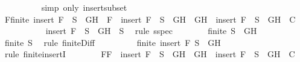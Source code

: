 \begin{isabellebody}
\ \ \ \ \ \ \ \ \isamarkupfalse%
\ {\isacharparenleft}simp\ only{\isacharcolon}\ insert{\isacharunderscore}subset{\isacharparenright}\isanewline
\ \ \ \ \ \ \isamarkupfalse%
\ F{}{\isacharcolon}{\isachardoublequoteopen}finite\ {\isacharparenleft}insert\ F\ \ {\isacharparenleft}S{\isacharprime}\ {\isacharminus}\ {\isacharbraceleft}G{\isacharcomma}H{\isacharbraceright}{\isacharparenright}{\isacharparenright}\ {\isasymlongrightarrow}\ F\ {\isasymin}\ {\isacharparenleft}insert\ F\ \ {\isacharparenleft}S{\isacharprime}\ {\isacharminus}\ {\isacharbraceleft}G{\isacharcomma}H{\isacharbraceright}{\isacharparenright}{\isacharparenright}\ {\isasymlongrightarrow}\ {\isacharbraceleft}G{\isacharcomma}H{\isacharbraceright}\ {\isasymunion}\ {\isacharparenleft}insert\ F\ \ {\isacharparenleft}S{\isacharprime}\ {\isacharminus}\ {\isacharbraceleft}G{\isacharcomma}H{\isacharbraceright}{\isacharparenright}{\isacharparenright}\ {\isasymin}\ C{\isachardoublequoteclose}\isanewline
\ \ \ \ \ \ \ \ \isamarkupfalse%
\ {}\ {\isacartoucheopen}insert\ F\ \ {\isacharparenleft}S{\isacharprime}\ {\isacharminus}\ {\isacharbraceleft}G{\isacharcomma}H{\isacharbraceright}{\isacharparenright}\ {\isasymsubseteq}\ S{\isacartoucheclose}\ \isamarkupfalse%
\ {\isacharparenleft}rule\ sspec{\isacharparenright}\isanewline
\ \ \ \ \ \ \isamarkupfalse%
\ {\isachardoublequoteopen}finite\ {\isacharparenleft}S{\isacharprime}\ {\isacharminus}\ {\isacharbraceleft}G{\isacharcomma}H{\isacharbraceright}{\isacharparenright}{\isachardoublequoteclose}\isanewline
\ \ \ \ \ \ \ \ \isamarkupfalse%
\ {\isacartoucheopen}finite\ S{\isacharprime}{\isacartoucheclose}\ \isamarkupfalse%
\ {\isacharparenleft}rule\ finite{\isacharunderscore}Diff{\isacharparenright}\isanewline
\ \ \ \ \ \ \isamarkupfalse%
\ \isamarkupfalse%
\ {\isachardoublequoteopen}finite\ {\isacharparenleft}insert\ F\ {\isacharparenleft}S{\isacharprime}\ {\isacharminus}\ {\isacharbraceleft}G{\isacharcomma}H{\isacharbraceright}{\isacharparenright}{\isacharparenright}{\isachardoublequoteclose}\ \isanewline
\ \ \ \ \ \ \ \ \isamarkupfalse%
\ {\isacharparenleft}rule\ finite{\isachardot}insertI{\isacharparenright}\isanewline
\ \ \ \ \ \ \isamarkupfalse%
\ F{}{\isacharcolon}{\isachardoublequoteopen}F\ {\isasymin}\ {\isacharparenleft}insert\ F\ \ {\isacharparenleft}S{\isacharprime}\ {\isacharminus}\ {\isacharbraceleft}G{\isacharcomma}H{\isacharbraceright}{\isacharparenright}{\isacharparenright}\ {\isasymlongrightarrow}\ {\isacharbraceleft}G{\isacharcomma}H{\isacharbraceright}\ {\isasymunion}\ {\isacharparenleft}insert\ F\ \ {\isacharparenleft}S{\isacharprime}\ {\isacharminus}\ {\isacharbraceleft}G{\isacharcomma}H{\isacharbraceright}{\isacharparenright}{\isacharparenright}\ {\isasymin}\ C{\isachardoublequoteclose}\isanewline

\end{isabellebody}

